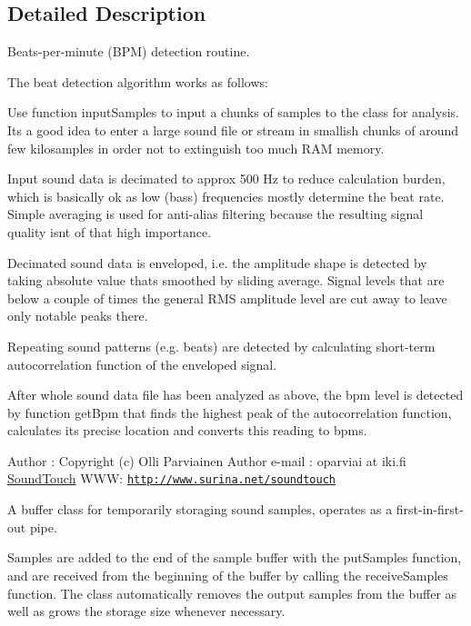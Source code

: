 \subsection{Detailed Description}
Beats-\/per-\/minute (B\+PM) detection routine.

The beat detection algorithm works as follows\+:
\begin{DoxyItemize}
\item Use function \textquotesingle{}input\+Samples\textquotesingle{} to input a chunks of samples to the class for analysis. It\textquotesingle{}s a good idea to enter a large sound file or stream in smallish chunks of around few kilosamples in order not to extinguish too much R\+AM memory.
\item Input sound data is decimated to approx 500 Hz to reduce calculation burden, which is basically ok as low (bass) frequencies mostly determine the beat rate. Simple averaging is used for anti-\/alias filtering because the resulting signal quality isn\textquotesingle{}t of that high importance.
\item Decimated sound data is enveloped, i.\+e. the amplitude shape is detected by taking absolute value that\textquotesingle{}s smoothed by sliding average. Signal levels that are below a couple of times the general R\+MS amplitude level are cut away to leave only notable peaks there.
\item Repeating sound patterns (e.\+g. beats) are detected by calculating short-\/term autocorrelation function of the enveloped signal.
\item After whole sound data file has been analyzed as above, the bpm level is detected by function \textquotesingle{}get\+Bpm\textquotesingle{} that finds the highest peak of the autocorrelation function, calculates it\textquotesingle{}s precise location and converts this reading to bpm\textquotesingle{}s.
\end{DoxyItemize}

Author \+: Copyright (c) Olli Parviainen Author e-\/mail \+: oparviai \textquotesingle{}at\textquotesingle{} iki.\+fi \hyperlink{classsoundtouch_1_1_sound_touch}{Sound\+Touch} W\+WW\+: \href{http://www.surina.net/soundtouch}{\tt http\+://www.\+surina.\+net/soundtouch}

A buffer class for temporarily storaging sound samples, operates as a first-\/in-\/first-\/out pipe.

Samples are added to the end of the sample buffer with the \textquotesingle{}put\+Samples\textquotesingle{} function, and are received from the beginning of the buffer by calling the \textquotesingle{}receive\+Samples\textquotesingle{} function. The class automatically removes the output samples from the buffer as well as grows the storage size whenever necessary.

